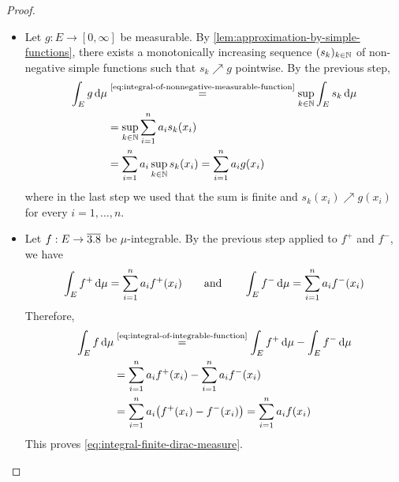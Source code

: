\begin{proof}
\begin{itemize}[leftmargin=2.0em, labelsep=.5em]
  \item[\hypertarget{proofstep:integral-finite-dirac-measure-nonnegative-measurable-function}{\ref{step:integral-of-nonnegative-measurable-function}.}]
Let $g:E\to[0,\infty]$ be measurable.
By \autoref{lem:approximation-by-simple-functions}, there exists a monotonically increasing sequence $(s_k)_{k\in\mathbb{N}}$ of non-negative simple functions such that $s_k\nearrow g$ pointwise.
By the previous step,
\[
\begin{aligned}
\int_E g\,\mathrm{d}\mu
&\overset{\text{\eqref{eq:integral-of-nonnegative-measurable-function}}}{=}
\sup_{k\in\mathbb{N}}\int_E s_k\,\mathrm{d}\mu
\\
&=
\sup_{k\in\mathbb{N}}\sum_{i=1}^n a_i s_k(x_i)
\\
&=
\sum_{i=1}^n  a_i \sup_{k\in\mathbb{N}} s_k(x_i)
=
\sum_{i=1}^n a_i g(x_i)
\end{aligned}
\]
where in the last step we used that the sum is finite and $s_k(x_i)\nearrow g(x_i)$ for every $i=1,\ldots,n$.

  \item[\hypertarget{proofstep:integral-finite-dirac-measure-integrable-function}{\ref{step:integral-of-integrable-function}.}]
Let $f:E\to\overline{3.8}$ be $\mu$-integrable.
By the previous step applied to $f^+$ and $f^-$, we have
\[
\int_E f^+\,\mathrm{d}\mu
=
\sum_{i=1}^n a_i f^+(x_i)
\qquad
\text{and}
\qquad
\int_E f^-\,\mathrm{d}\mu
=
\sum_{i=1}^n a_i f^-(x_i)
\]
Therefore, 
\[
\begin{aligned}
\int_E f\,\mathrm{d}\mu
&\overset{\text{\eqref{eq:integral-of-integrable-function}}}{=}
\int_E f^+\,\mathrm{d}\mu
-
\int_E f^-\,\mathrm{d}\mu
\\
&=
\sum_{i=1}^n a_i f^+(x_i)
-
\sum_{i=1}^n a_i f^-(x_i)
\\
&=
\sum_{i=1}^n a_i\bigl(f^+(x_i)-f^-(x_i)\bigr)
=
\sum_{i=1}^n a_i f(x_i)
\end{aligned}
\]
This proves \eqref{eq:integral-finite-dirac-measure}.
\qedhere
\end{itemize}
\end{proof}


